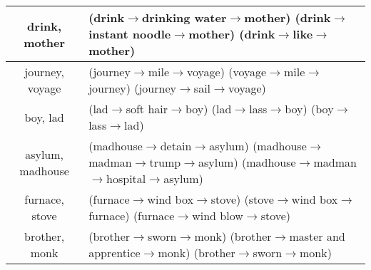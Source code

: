 \begin{table*}[th]
\begin{tabular}{|c|l|}
drink, mother& (drink$\rightarrow$drinking water$\rightarrow$mother)	(drink$\rightarrow$instant noodle$\rightarrow$mother)	(drink$\rightarrow$like$\rightarrow$mother)\\ \hline
journey, voyage& (journey$\rightarrow$mile$\rightarrow$voyage)	(voyage$\rightarrow$mile$\rightarrow$journey)	(journey$\rightarrow$sail$\rightarrow$voyage)\\ \hline
boy, lad & (lad$\rightarrow$soft hair$\rightarrow$boy)	(lad$\rightarrow$lass$\rightarrow$boy)	(boy$\rightarrow$lass$\rightarrow$lad)\\ \hline
asylum, madhouse & (madhouse$\rightarrow$detain$\rightarrow$asylum)	(madhouse$\rightarrow$madman$\rightarrow$trump$\rightarrow$asylum)	(madhouse$\rightarrow$madman$\rightarrow$hospital$\rightarrow$asylum)\\ \hline
furnace, stove& (furnace$\rightarrow$wind box$\rightarrow$stove)	(stove$\rightarrow$wind box$\rightarrow$furnace)	(furnace$\rightarrow$wind blow$\rightarrow$stove)\\ \hline
brother, monk & (brother$\rightarrow$sworn$\rightarrow$monk)	(brother$\rightarrow$master and apprentice$\rightarrow$monk)	(brother$\rightarrow$sworn$\rightarrow$monk)\\ \hline
%

\end{tabular}
\end{table*}
